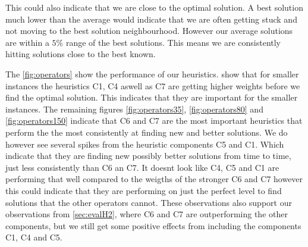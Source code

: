 \documentclass[../main.tex]{subfiles}
\begin{document}
This could also indicate that we are close to the optimal solution. 
A best solution much lower than the average would indicate that we are often getting stuck and not moving to the best solution neighbourhood. 
However our average solutions are within a $5\%$ range of the best solutions.
This means we are consistently hitting solutions close to the best known.
\par
The \cref{fig:operators} show the performance of our heuristics.
 show that for smaller instances the heuristics C1, C4 aswell as C7 are getting higher weights before we find the optimal solution. This indicates that they are important for the smaller instances.
The remaining figures \ref{fig:operators35}, \ref{fig:operators80} and \ref{fig:operators150} indicate that C6 and C7 are the most important heuristics that perform the the most consistently at finding new and better solutions. 
We do however see several spikes from the heuristic components C5 and C1. 
Which indicate that they are finding new possibly better solutions from time to time, just less consistently than C6 an C7. 
It doesnt look like C4, C5 and C1 are performing that well compared to the weigths of the stronger C6 and C7 however this could indicate that they are performing on just the perfect level to find solutions that the other operators cannot. 
These observations also support our observations from \cref{sec:evalH2}, where C6 and C7 are outperforming the other components, but we still get some positive effects from including the components C1, C4 and C5. 

\biblio                                                         
\end{document}
